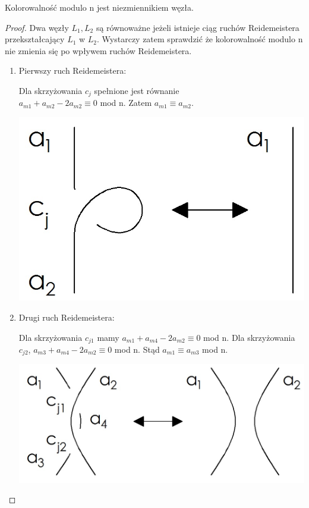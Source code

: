 \begin{twierdzenie} Kolorowalność modulo n jest niezmiennikiem węzła.
\end{twierdzenie}
\begin{proof}
Dwa węzły $L_{1}, L_{2}$ są równoważne jeżeli istnieje ciąg ruchów Reidemeistera przekształcający $L_{1}$ w $L_{2}$. Wystarczy zatem sprawdzić że kolorowalność modulo n nie zmienia się po wpływem ruchów Reidemeistera.

\begin{enumerate} \item Pierwszy ruch Reidemeistera: 

	\begin{minipage}{0.5\textwidth}
	Dla skrzyżowania $c_{j}$ spełnione jest równanie \\ $a_{m1}+a_{m2}-2a_{m2} \equiv 0$ mod n. Zatem $a_{m1} \equiv a_{m2}$.
	\end{minipage}
	\begin{minipage}{0.5\textwidth}
		\begin{center}
			\includegraphics[scale=0.3]{2/Obrazy/R1}
		\end{center}
	\end{minipage}
\item Drugi ruch Reidemeistera: 

	\begin{minipage}{0.5\textwidth}
	Dla skrzyżowania $c_{j1}$ mamy $a_{m1}+a_{m4}-2a_{m2} \equiv 0$ mod n. Dla skrzyżowania $c_{j2}$, $a_{m3}+a_{m4}-2a_{m2} \equiv 0$ mod n. Stąd $a_{m1} \equiv a_{m3} $ mod n.
	\end{minipage}
	\begin{minipage}{0.5\textwidth}
		\begin{center}
			\includegraphics[scale=0.3]{2/Obrazy/R2}
		\end{center}
	\end{minipage}
	

\end{enumerate}
\end{proof}
